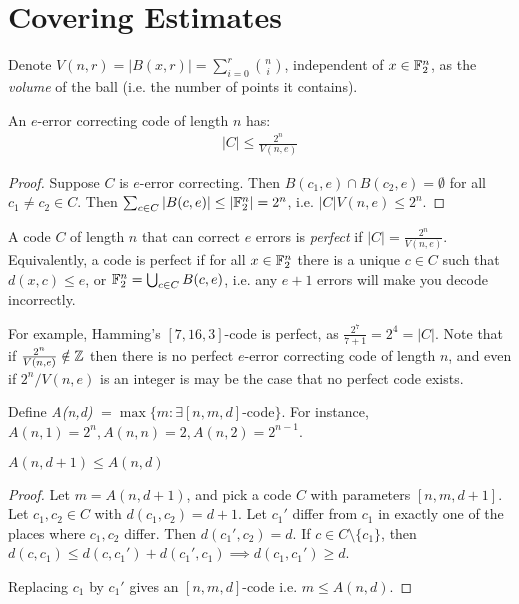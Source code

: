 \documentclass[10pt,a4paper]{article}
\begin{document}
\section{Covering Estimates}
Denote $V(n,r) = |B(x,r)| = \sum_{i=0}^r \binom{n}{i}$, independent of $x \in \mathbb{F}_2^n$, as the \emph{volume} of the ball (i.e. the number of points it contains).

\begin{lemma}
An $e$-error correcting code of length $n$ has:
\begin{align*}
|C| \leq \frac{2^n}{V(n,e)}
\end{align*}
\end{lemma}
\begin{proof}
Suppose $C$ is $e$-error correcting. Then $B(c_1, e) \cap B(c_2, e) = \emptyset$ for all $c_1 \neq c_2 \in C$. Then $\sum_{c \in C} |B(c,e)| \leq |\mathbb{F}_2^n| = 2^n$, i.e. $|C|V(n,e) \leq 2^n$.
\end{proof}
A code $C$ of length $n$ that can correct $e$ errors is \emph{perfect} if $|C|=\frac{2^n}{V(n,e)}$. Equivalently, a code is perfect if for all $x \in \mathbb{F}_2^n$ there is a unique $c \in C$ such that $d(x,c) \leq e$, or $\mathbb{F}_2^n = \bigcup_{c\in C}B(c,e)$, i.e. any $e+1$ errors will make you decode incorrectly.

For example, Hamming's $[7,16,3]$-code is perfect, as $\frac{2^7}{7+1} = 2^4 = |C|$. Note that if $\frac{2^n}{V(n,e)} \notin \mathbb{Z}$ then there is no perfect $e$-error correcting code of length $n$, and even if $2^n/V(n,e)$ is an integer is may be the case that no perfect code exists.

Define \emph{A(n,d)} $= \max\{m : \exists [n,m,d]$-code$\}$. For instance, $A(n,1) = 2^n, A(n,n) = 2, A(n,2) = 2^{n-1}$.

\begin{lemma}
$A(n,d+1) \leq A(n,d)$
\end{lemma}
\begin{proof}
Let $m = A(n,d+1)$, and pick a code $C$ with parameters $[n,m,d+1]$. Let $c_1, c_2 \in C$ with $d(c_1,c_2) = d+1$. Let $c_1'$ differ from $c_1$ in exactly one of the places where $c_1, c_2$ differ. Then $d(c_1', c_2) = d$. If $c \in C\setminus\{c_1\}$, then $d(c,c_1)\leq d(c,c_1')+d(c_1', c_1) \implies d(c_1, c_1') \geq d$.

Replacing $c_1$ by $c_1'$ gives an $[n,m,d]$-code i.e. $m \leq A(n,d)$.
\end{proof}
\end{document}
